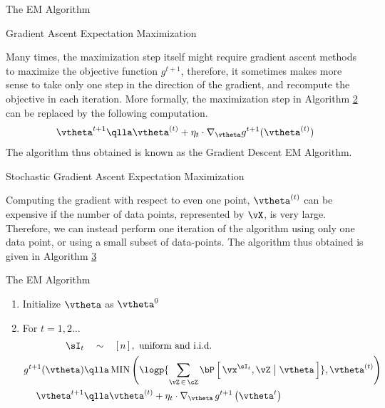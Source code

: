 \documentclass[11pt,a4paper]{article}
\begin{document}
\begin{ssection}{The EM Algorithm}
	\begin{ssubsection}{Gradient Ascent Expectation Maximization}

		Many times, the maximization step itself might require gradient ascent methods to maximize the objective function $g^{t + 1}$, therefore, it sometimes makes more sense to take only one step in the direction of the gradient, and recompute the objective in each iteration. More formally, the maximization step in Algorithm \hyperlink{algo:2}{2} can be replaced by the following computation.
		\begin{align*}
			\vtheta^{t + 1} \qlla \vtheta^{(t)} + \eta_t \cdot \nabla_{\vtheta} g^{t + 1}(\vtheta^{(t)})
		\end{align*}
		The algorithm thus obtained is known as the Gradient Descent EM Algorithm.

	\end{ssubsection}

	\begin{ssubsection}{Stochastic Gradient Ascent Expectation Maximization}

		Computing the gradient with respect to even one point, $\vtheta^{(t)}$ can be expensive if the number of data points, represented by $\vX$, is very large. Therefore, we can instead perform one iteration of the algorithm using only one data point, or using a small subset of data-points. The algorithm thus obtained is given in Algorithm \hyperlink{algo:3}{3}

		\begin{algo}[0.9\textwidth]{The EM Algorithm}
		\begin{enumerate}
			\item Initialize $\vtheta$ as $\vtheta^0$
			\item For $t = 1, 2 \dots$
				\begin{align*}
					\sI_t					&\qsim	\brac{n}, \ \mt{uniform and i.i.d.} \\
					g^{t + 1}(\vtheta)	&\qlla	\tfunc{MIN}{\logp{\sum_{\vZ\,\in\,\cZ} \prob{\vx^{\sI_t}, \vZ \pipe \vtheta}}, \vtheta^{(t)}} \\
					\vtheta^{t + 1}		&\qlla	\vtheta^{(t)} + \eta_t \cdot \nabla_{\vtheta} \func{g^{t + 1}}{\vtheta^t}
				\end{align*}
		\end{enumerate}
		\end{algo}

	\end{ssubsection}

\end{ssection}
\end{document}
